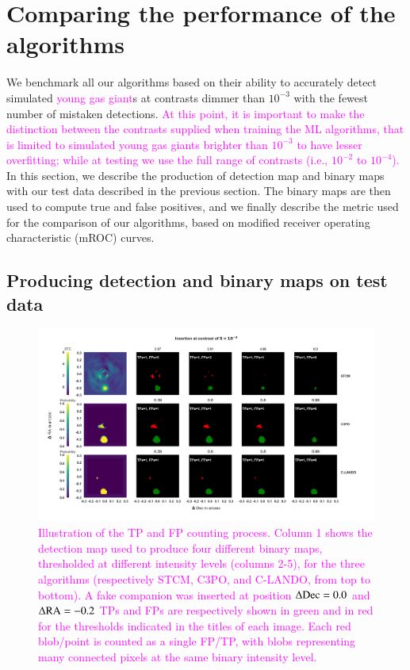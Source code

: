 \documentclass[referee]{aa} %
\newcommand{\newchange}[1]{\textcolor{magenta}{#1}}
\begin{document}
\section{Comparing the performance of the algorithms}\label{sec:results}

We benchmark all our algorithms based on their ability to accurately detect simulated \newchange{young gas giant}s at contrasts dimmer than $10^{-3}$ with the fewest number of mistaken detections.
\newchange{At this point, it is important to make the distinction between the contrasts supplied when training the ML algorithms, that is limited to simulated young gas giants brighter than $10^{-3}$ to have lesser overfitting; while at testing we use the full range of contrasts (i.e., $10^{-2}$ to $10^{-4}$).}
In this section, we describe the production of detection map and binary maps with our test data described in the previous section.
The binary maps are then used to compute true and false positives, and we finally describe the metric used for the comparison of our algorithms, based on modified receiver operating characteristic (mROC) curves.


\subsection{Producing detection and binary maps on test data}\label{sec:testdata}

\begin{figure}[t]
    \centering
    \includegraphics[width=\textwidth]{Fig3_Mar2024_referee.png}
    \caption{\newchange{Illustration of the TP and FP counting process. Column 1 shows the detection map used to produce four different binary maps, thresholded at different intensity levels (columns 2-5), for the three algorithms (respectively STCM, C3PO, and C-LANDO, from top to bottom). A fake companion was inserted at position $\Delta{\rm Dec}=0.0$ and $\Delta{\rm RA} = -0.2$ TPs and FPs are respectively shown in green and in red for the thresholds indicated in the titles of each image. Each red blob/point is counted as a single FP/TP, with blobs representing many connected pixels at the same binary intensity level.}}
    \label{fig:sample_detmaps}
\end{figure}
\end{document}
